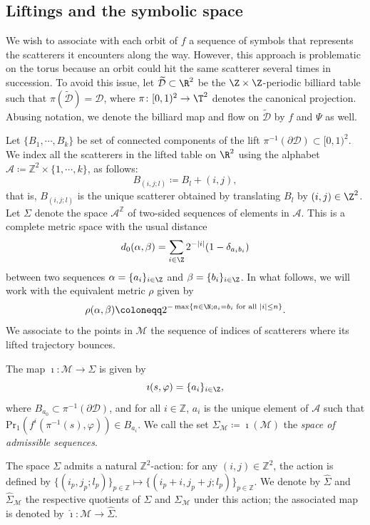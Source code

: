 \documentclass[reqno,11pt]{amsart}
\begin{document}
\subsection{Liftings and the symbolic space}
We wish to associate with each orbit of $f$ a sequence of symbols that represents the scatterers it encounters along the way.
However, this approach is problematic on the torus because an orbit could hit the same scatterer several times in succession.
To avoid this issue, let \( \widetilde{\mathcal{D}}\subset \R^2 \) be the \( \Z\times \Z \)-periodic billiard table such that \( \pi(\widetilde{\mathcal{D}})=\mathcal{D} \), where \( \pi\colon [0,1)^2\to \T^2 \) denotes the canonical projection. 
Abusing notation, we denote the billiard map and flow on \( \widetilde{\mathcal{D}} \) by \( f \) and \( \Psi \) as well.
\par Let \( \{B_1, \cdots, B_k\} \) be set of connected components of the lift \( \pi^{-1}(\partial\mathcal{D}) \subset [0,1)^2. \)
We index all the scatterers in the lifted table on \( \R^2 \) using the alphabet \( \mathcal{A} \coloneqq \mathbb{Z}^2\times \{1, \cdots, k\} \), as follows: 
\[
    B_{(i,j;l)} \coloneqq B_l + (i,j),
\]
that is, \( B_{(i,j;l)} \) is the unique scatterer obtained by translating \( B_l \) by \( (i,j) \in \Z^2 \).
Let \( \Sigma \) denote the space \( \mathcal{A}^\mathbb{Z} \) of two-sided sequences of elements in \( \mathcal{A} \).
This is a complete metric space with the usual distance
\[
    d_0(\alpha, \beta) = \sum_{i \in \Z} 2^{-|i|}(1 - \delta_{a_ib_i})
\]
between two sequences \( \alpha = \{a_i\}_{i \in \Z} \) and \( \beta = \{b_i\}_{i \in \Z} \).
In what follows, we will work with the equivalent metric \( \rho \) given by
\[
    \rho(\alpha, \beta) \coloneqq 2^{-\max\{n \in \N; a_i = b_i \text{ for all } |i| \leq n\}}.
\]
We associate to the points in \( \mathcal{M} \) the sequence of indices of scatterers where its lifted trajectory bounces. 
\begin{defi}
The map \( \imath \colon \mathcal{M} \to \Sigma \) is given by
\[
    \imath(s,\varphi) = \{a_i\}_{i \in \Z}, 
\]
where $B_{a_0}\subset \pi^{-1}(\partial \mathcal{D})$, and for all $i \in \mathbb{Z}$, \( a_i \) is the unique element of \( \mathcal{A} \) such that \( \mathrm{Pr}_1(f^i(\pi^{-1}(s), \varphi)) \in B_{a_i} \).
We call the set \( \Sigma_\mathcal{M} \coloneqq \imath(\mathcal{M}) \) the \emph{space of admissible sequences}.
\end{defi}
The space $\Sigma$ admits a natural $\mathbb{Z}^2$-action: for any $(i,j)\in \mathbb{Z}^2$, the action is defined by $\{(i_p,j_p;l_p)\}_{p \in \mathbb{Z}}\mapsto \{(i_p+i,j_p+j;l_p)\}_{p \in \mathbb{Z}}$. We denote by $\hat \Sigma$ and $\hat {\Sigma}_\mathcal{M}$ the respective quotients of $\Sigma$ and $\Sigma_\mathcal{M}$ under this action; the associated map is denoted by $\hat \imath\colon \mathcal{M} \to \hat \Sigma$. 
\end{document}
